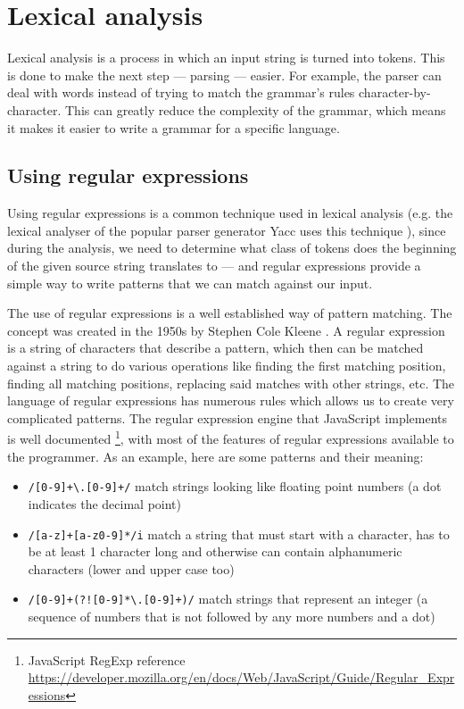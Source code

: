 \chapter{Lexical analysis}
Lexical analysis is a process in which an input string is turned into tokens. This is done to make the next step --- parsing --- easier. For example, the parser can deal with words instead of trying to match the grammar's rules character-by-character. This can greatly reduce the complexity of the grammar, which means it makes it easier to write a grammar for a specific language.
\section{Using regular expressions}
Using regular expressions is a common technique used in lexical analysis (e.g. the lexical analyser of the popular parser generator Yacc uses this technique \cite{Lex}), since during the analysis, we need to determine what class of tokens does the beginning of the given source string translates to --- and regular expressions provide a simple way to write patterns that we can match against our input.

The use of regular expressions is a well established way of pattern matching. The concept was created in the 1950s by Stephen Cole Kleene \cite{kleene1951representation}. A regular expression is a string of characters that describe a pattern, which then can be matched against a string to do various operations like finding the first matching position, finding all matching positions, replacing said matches with other strings, etc. The language of regular expressions has numerous rules which allows us to create very complicated patterns. The regular expression engine that JavaScript implements is well documented \footnote{JavaScript RegExp reference \url{https://developer.mozilla.org/en/docs/Web/JavaScript/Guide/Regular_Expressions}}, with most of the features of regular expressions available to the programmer. As an example, here are some patterns and their meaning:
\begin{itemize}
\item \texttt{/[0-9]+\textbackslash.[0-9]+/} match strings looking like floating point numbers (a dot indicates the decimal point)
\item \texttt{/[a-z]+[a-z0-9]*/i} match a string that must start with a character, has to be at least 1 character long and otherwise can contain alphanumeric characters (lower and upper case too)
\item \texttt{/[0-9]+(?![0-9]*\textbackslash.[0-9]+)/} match strings that represent an integer (a sequence of numbers that is not followed by any more numbers and a dot)
\end{itemize}


